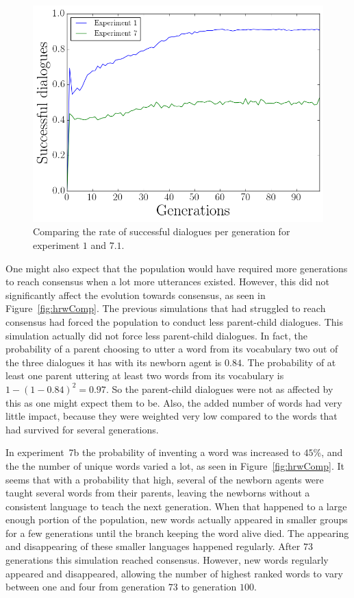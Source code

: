 \begin{figure}
    \centering
    \includegraphics[width=0.7\linewidth]{fig/Discussion/DialogueComparison}
    \caption{Comparing the rate of successful dialogues per generation for experiment $1$ and $7.1$.}
    \label{fig:DialogueComp}
\end{figure}

One might also expect that the population would have required more generations to reach consensus when a lot more utterances existed. However, this did not significantly affect the evolution towards consensus, as seen in Figure~\ref{fig:hrwComp}. The previous simulations that had struggled to reach consensus had forced the population to conduct less parent-child dialogues. This simulation actually did not force less parent-child dialogues. In fact, the probability of a parent choosing to utter a word from its vocabulary two out of the three dialogues it has with its newborn agent is $0.84$. The probability of at least one parent uttering at least two words from its vocabulary is $1 - (1-0.84)^2 = 0.97$. So the parent-child dialogues were not as affected by this as one might expect them to be. Also, the added number of words had very little impact, because they were weighted very low compared to the words that had survived for several generations. 

In experiment~7b the probability of inventing a word was increased to $45\%$, and the the number of unique words varied a lot, as seen in Figure~\ref{fig:hrwComp}. It seems that with a probability that high, several of the newborn agents were taught several words from their parents, leaving the newborns without a consistent language to teach the next generation. When that happened to a large enough portion of the population, new words actually appeared in smaller groups for a few generations until the branch keeping the word alive died. The appearing and disappearing of these smaller languages happened regularly. After $73$ generations this simulation reached consensus. However, new words regularly appeared and disappeared, allowing the number of highest ranked words to vary between one and four from generation $73$ to generation $100$.

